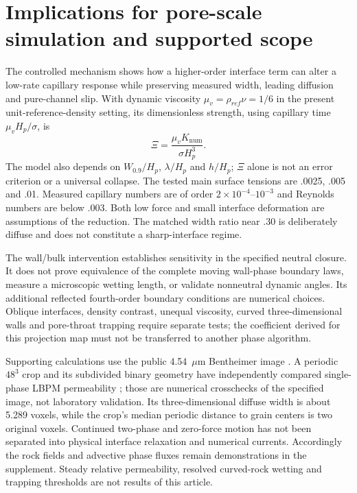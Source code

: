 \documentclass[preprint,12pt]{elsarticle}
\begin{document}
\section{Implications for pore-scale simulation and supported scope}
The controlled mechanism shows how a higher-order interface term can alter
a low-rate capillary response while preserving measured width, leading
diffusion and pure-channel slip. With dynamic viscosity
$\mu_v=\rho_{ref}\nu=1/6$ in the present unit-reference-density setting,
its dimensionless strength, using capillary time $\mu_v H_p/\sigma$, is
\begin{equation}
 \Xi=\frac{\mu_v K_{\mathrm{num}}}{\sigma H_p^3}.
\end{equation}
The model also depends on $W_{0.9}/H_p$, $\lambda/H_p$ and $h/H_p$;
$\Xi$ alone is not an error criterion or a universal collapse.
The tested main surface tensions are .0025, .005 and .01.
Measured capillary numbers are of order $2\times10^{-4}$--$10^{-3}$ and
Reynolds numbers are below .003. Both low force and small interface
deformation are assumptions of the reduction.
The matched width ratio near .30 is deliberately diffuse and does not
constitute a sharp-interface regime.

The wall/bulk intervention establishes sensitivity in the specified
neutral closure. It does not prove equivalence of the complete moving
wall-phase boundary laws, measure a microscopic wetting length, or validate
nonneutral dynamic angles. Its additional reflected fourth-order boundary
conditions are numerical choices. Oblique interfaces, density contrast,
unequal viscosity, curved three-dimensional walls and pore-throat trapping
require separate tests; the coefficient derived for this projection map
must not be transferred to another phase algorithm.

Supporting calculations use the public 4.54~$\mu$m Bentheimer image
\cite{shah2014}. A periodic $48^3$ crop and its subdivided binary geometry
have independently compared single-phase LBPM permeability
\cite{mcclure2021}; those are numerical crosschecks of the specified image,
not laboratory validation. Its three-dimensional diffuse width is about
5.289 voxels, while the crop's median periodic distance to grain centers is
two original voxels. Continued two-phase and zero-force motion has not been
separated into physical interface relaxation and numerical currents.
Accordingly the rock fields and advective phase fluxes remain demonstrations
in the supplement. Steady relative permeability, resolved curved-rock
wetting and trapping thresholds are not results of this article.
\end{document}
